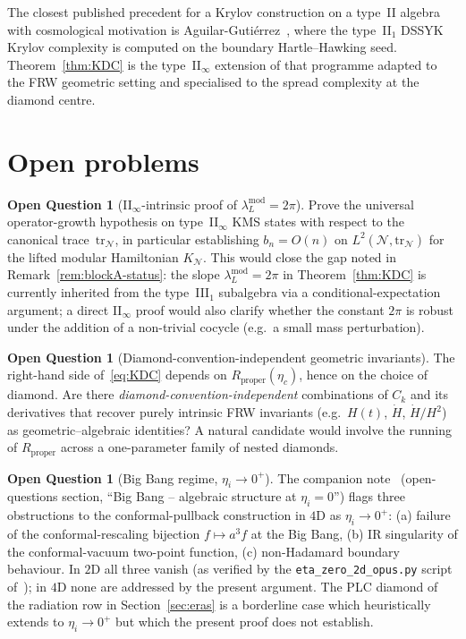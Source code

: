 \documentclass[11pt]{article}
\theoremstyle{definition}
\newtheorem{question}[theorem]{Open Question}
\newcommand{\NN}{\mathcal{N}}
\newcommand{\Rprop}{R_{\mathrm{proper}}}
\begin{document}
The closest published precedent for a Krylov construction on a
type~II algebra with cosmological motivation is
Aguilar-Guti\'errez~\cite{AguilarGutierrez2025}, where the
type~II$_1$ DSSYK Krylov complexity is computed on the boundary
Hartle--Hawking seed. Theorem~\ref{thm:KDC} is the type~II$_\infty$
extension of that programme adapted to the FRW geometric setting and
specialised to the spread complexity at the diamond centre.

\section{Open problems}\label{sec:open}

\begin{question}[II$_\infty$-intrinsic proof of $\lambda_L^{\mathrm{mod}}=2\pi$]\label{q:lambda}
Prove the universal operator-growth hypothesis on type~II$_\infty$
KMS states with respect to the canonical
trace~$\mathrm{tr}_\NN$, in particular establishing $b_n = O(n)$ on
$L^2(\NN, \mathrm{tr}_\NN)$ for the lifted modular Hamiltonian
$K_\NN$. This would close the gap noted in
Remark~\ref{rem:blockA-status}: the slope $\lambda_L^{\mathrm{mod}}=2\pi$
in Theorem~\ref{thm:KDC} is currently inherited from the type~III$_1$
subalgebra via a conditional-expectation argument; a direct
II$_\infty$ proof would also clarify whether the constant $2\pi$ is
robust under the addition of a non-trivial cocycle (e.g.\ a small
mass perturbation).
\end{question}

\begin{question}[Diamond-convention-independent geometric invariants]\label{q:diamond}
The right-hand side of~\eqref{eq:KDC} depends on $\Rprop(\eta_c)$,
hence on the choice of diamond. Are there \emph{diamond-convention-independent}
combinations of $C_k$ and its derivatives that recover purely
intrinsic FRW invariants (e.g.\ $H(t)$, $\dot H$, $\dot H/H^2$) as
geometric--algebraic identities? A natural candidate would involve
the running of $\Rprop$ across a one-parameter family of nested
diamonds.
\end{question}

\begin{question}[Big Bang regime, $\eta_i \to 0^+$]\label{q:bigbang}
The companion note~\cite{Remondiere2026} (open-questions section,
``Big Bang -- algebraic structure at $\eta_i=0$'') flags three
obstructions to the conformal-pullback construction in $4$D as
$\eta_i\to 0^+$:
(a) failure of the conformal-rescaling bijection
$f\mapsto a^3 f$ at the Big Bang, (b) IR singularity of the
conformal-vacuum two-point function, (c) non-Hadamard boundary
behaviour. In $2$D all three vanish (as verified by the
\texttt{eta\_zero\_2d\_opus.py} script of~\cite{Remondiere2026}); in
$4$D none are addressed by the present argument. The PLC diamond of
the radiation row in Section~\ref{sec:eras} is a borderline case
which heuristically extends to $\eta_i\to 0^+$ but which the present
proof does not establish.
\end{question}
\end{document}
